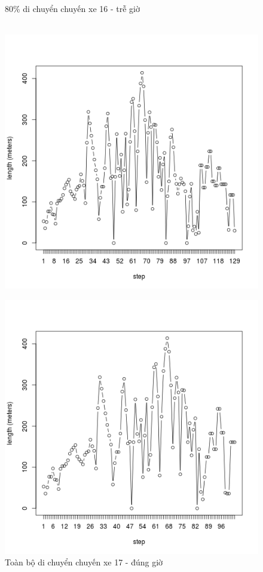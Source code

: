 \documentclass[a4paper, 13pt]{report}
\begin{document}
\begin{figure}[!htb]
  \caption*{80\% di chuyển chuyến xe 16 - trễ giờ}
\endminipage\\
  \includegraphics[width=\linewidth]{test_100_17}
  \caption*{Toàn bộ di chuyển chuyến xe 17 - đúng giờ}
\endminipage
{}
  \includegraphics[width=\linewidth]{test_80_17}

\end{figure}
\end{document}
